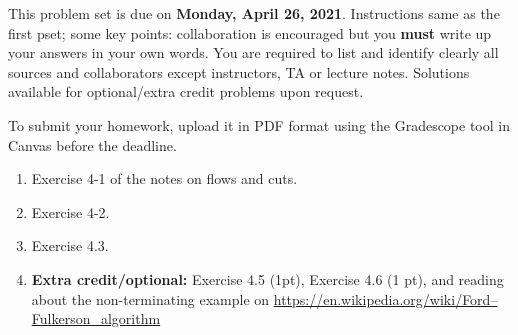 \documentclass[12pt]{article} 
\begin{document}

\medskip
This problem set is due on \textbf{Monday, April 26, 2021}. Instructions same as the first pset; some key points: collaboration is encouraged but you {\bf must} write up
your answers in your own words. You are required to list and identify clearly all sources and collaborators except instructors, TA or lecture notes. Solutions available for optional/extra credit problems upon request. %

To submit your homework, upload it in PDF format using the Gradescope tool in Canvas before the deadline.
\begin{enumerate}
\item
Exercise 4-1 of the notes on flows and cuts.
\item
Exercise 4-2.
\item 
Exercise 4.3.
\item \textbf{Extra credit/optional: } Exercise 4.5 (1pt), Exercise 4.6 (1 pt), and reading about the non-terminating example on \url{https://en.wikipedia.org/wiki/Ford–Fulkerson_algorithm}

\end{enumerate}
\end{document}
